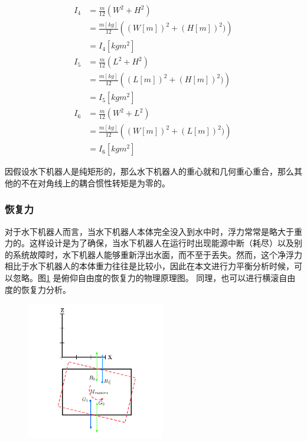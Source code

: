 \begin{equation}
\begin{aligned}
I_4 &= \frac{m}{12}\left ( W^2 + H^2 \right ) \\
    &= \frac{m[kg]}{12}\left ( (W[m])^2 + (H[m])^2) \right )\\
    &= I_4[kgm^{2}] \\
I_5 &= \frac{m}{12}\left ( L^2 + H^2 \right ) \\
    &= \frac{m[kg]}{12}\left ( (L[m])^2 + (H[m])^2) \right )\\
    &= I_5[kgm^{2}]\\
I_6 &= \frac{m}{12}\left ( W^2 + L^2 \right ) \\
    &= \frac{m[kg]}{12}\left ( (W[m])^2 + (L[m])^2) \right )\\
    &= I_6[kgm^{2}]
\end{aligned}
\label{eq:chap4:massrot}
\end{equation}

因假设水下机器人是纯矩形的，那么水下机器人的重心就和几何重心重合，那么其他的不在对角线上的耦合惯性转矩是为零的。

\subsubsection{恢复力}

对于水下机器人而言，当水下机器人本体完全没入到水中时，浮力常常是略大于重力的。这样设计是为了确保，当水下机器人在运行时出现能源中断（耗尽）以及别的系统故障时，水下机器人能够重新浮出水面，而不至于丢失。然而，这个净浮力相比于水下机器人的本体重力往往是比较小，因此在本文进行力平衡分析时候，可以忽略。图\ref{fig:chap4:F1} 是俯仰自由度的恢复力的物理原理图\cite{eidsvik2015identification}。 同理，也可以进行横滚自由度的恢复力分析。

\begin{figure}
\label{fig:chap4:F1}
\centering
\includegraphics[width = 6cm]{figure/chap4/restoring.png}
\end{figure}

